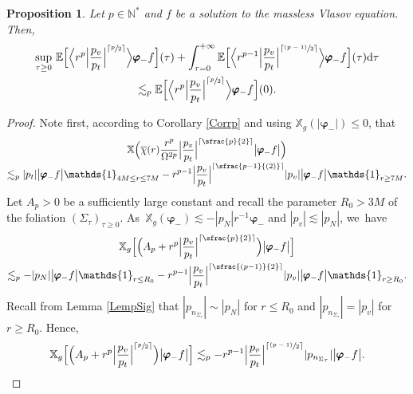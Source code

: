 \documentclass[JEP,XML,SOM,Unicode,published]{cedram}
\newcommand{\psfrac}[2]{\sfrac{(#1)}{#2}}
\newcommand{\spfrac}[2]{\sfrac{#1}{(#2)}}
\theoremstyle{plain}
\newtheorem{proposition}{Proposition}[section]
\theoremstyle{definition}
\newcommand\T{{\mathbb{X}}}
\newcommand\dr{{\mathrm{d}}}
\begin{document}
\begin{proposition}\label{ProILEDrp}
Let $p \in \mathbb{N}^*$ and $f$ be a solution to the massless Vlasov equation. Then,
\begin{multline*}
\sup_{\tau \geq 0}\, \mathbb{E}\Bigl[ \Big\langle r^{p} \Big|\frac{p_v}{p_t}\Big|^{\lceil \sfrac{p}{2} \rceil} \Big\rangle \pmb{\varphi}_- f \Bigr] (\tau)+\int_{\tau=0}^{+\infty} \mathbb{E}\Bigl[ \Big\langle r^{p-1} \Big|\frac{p_v}{p_t}\Big|^{\lceil \psfrac{p-1}{2} \rceil} \Big\rangle \pmb{\varphi}_- f \Bigr] (\tau) \dr \tau \\
\lesssim_p \mathbb{E}\Bigl[ \Big\langle r^{p} \Big|\frac{p_v}{p_t}\Big|^{\lceil \sfrac{p}{2} \rceil} \Big\rangle \pmb{\varphi}_- f \Bigr] (0).
\end{multline*}
\end{proposition}
\begin{proof}
Note first, according to Corollary \ref{Corrp} and using $\T_g (|\pmb{\varphi}_-|) \leq 0$, that
\begin{multline*}
\T \Bigl(\overline{\chi}(r) \frac{ r^{p}}{\Omega^{2p}} \Big|\frac{p_v}{p_t}\Big|^{\lceil \sfrac{p}{2} \rceil} \big| \pmb{\varphi}_- f \big| \Bigr)\\[-3pt]\lesssim_p |p_t|\big| \pmb{\varphi}_- f \big| \mathds{1}_{4M \leq r \leq 7M}- r^{p-1} \Big|\frac{p_v}{p_t}\Big|^{\lceil \spfrac{p-1}{2} \rceil}|p_v|\big| \pmb{\varphi}_- f \big| \mathds{1}_{r \geq 7M}.
\end{multline*}
Let $A_p>0$ be a sufficiently large constant and recall the parameter $R_0 > 3M$ of the foliation $(\Sigma_\tau)_{\tau \geq 0}$. As~$\T_g (\pmb{\varphi}_-) \lesssim -|p_N|r^{-1}\pmb{\varphi}_-$ and $|p_v| \lesssim |p_N|$, we~have
\begin{multline*}
\T_g \Bigl[ \Bigl(A_p+ r^{p} \Big|\frac{p_v}{p_t}\Big|^{\lceil \sfrac{p}{2} \rceil} \Bigr) \big| \pmb{\varphi}_- f \big| \Bigr]\\
\lesssim_p -|p_N|\big| \pmb{\varphi}_- f \big| \mathds{1}_{r \leq R_0}- r^{p-1} \Big|\frac{p_v}{p_t}\Big|^{\lceil \psfrac{p-1}{2} \rceil}|p_v|\big| \pmb{\varphi}_- f \big| \mathds{1}_{r \geq R_0}.
\end{multline*}
Recall from Lemma \ref{LempSig} that $|p_{n_{\Sigma_\tau}}| \sim |p_N|$ for $r \leq R_0$ and $|p_{n_{\Sigma_\tau}}| =|p_v|$ for $r \geq R_0$. Hence,
\[
\T_g \Bigl[ \Bigl(A_p+ r^{p} \Big|\frac{p_v}{p_t}\Big|^{\lceil \sfrac{p}{2} \rceil} \Bigr) \big| \pmb{\varphi}_- f \big| \Bigr] \lesssim_p -r^{p-1} \Big|\frac{p_v}{p_t}\Big|^{\lceil \psfrac{p-1}{2} \rceil}|p_{n_{\Sigma_\tau}}|\big| \pmb{\varphi}_- f \big|.
\]
\end{proof}
\end{document}
